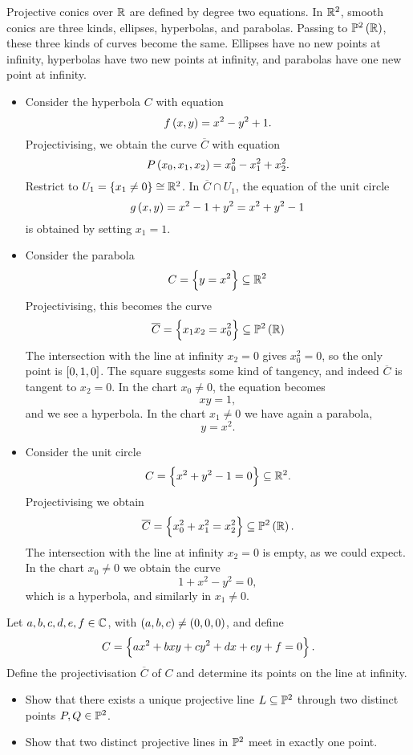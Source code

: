 \begin{example}
Projective conics over $ \R $ are defined by degree two equations. In $ \R^2 $, smooth conics are three kinds, ellipses, hyperbolas, and parabolas. Passing to $ \P^2\br{\R} $, these three kinds of curves become the same. Ellipses have no new points at infinity, hyperbolas have two new points at infinity, and parabolas have one new point at infinity.
\begin{itemize}
\item Consider the hyperbola $ C $ with equation
$$ f\br{x, y} = x^2 - y^2 + 1. $$
Projectivising, we obtain the curve $ \overline{C} $ with equation
$$ P\br{x_0, x_1, x_2} = x_0^2 - x_1^2 + x_2^2. $$
Restrict to $ U_1 = \cbr{x_1 \ne 0} \cong \R^2 $. In $ \overline{C} \cap U_1 $, the equation of the unit circle
$$ g\br{x, y} = x^2 - 1 + y^2 = x^2 + y^2 - 1 $$
is obtained by setting $ x_1 = 1 $.
\item Consider the parabola
$$ C = \cbr{y = x^2} \subseteq \R^2 $$
Projectivising, this becomes the curve
$$ \overline{C} = \cbr{x_1x_2 = x_0^2} \subseteq \P^2\br{\R} $$
The intersection with the line at infinity $ x_2 = 0 $ gives $ x_0^2 = 0 $, so the only point is $ \sbr{0, 1, 0} $. The square suggests some kind of tangency, and indeed $ \overline{C} $ is tangent to $ x_2 = 0 $. In the chart $ x_0 \ne 0 $, the equation becomes
$$ xy = 1, $$
and we see a hyperbola. In the chart $ x_1 \ne 0 $ we have again a parabola,
$$ y = x^2. $$
\item Consider the unit circle
$$ C = \cbr{x^2 + y^2 - 1 = 0} \subseteq \R^2. $$
Projectivising we obtain
$$ \overline{C} = \cbr{x_0^2 + x_1^2 = x_2^2} \subseteq \P^2\br{\R}. $$
The intersection with the line at infinity $ x_2 = 0 $ is empty, as we could expect. In the chart $ x_0 \ne 0 $ we obtain the curve
$$ 1 + x^2 - y^2 = 0, $$
which is a hyperbola, and similarly in $ x_1 \ne 0 $.
\end{itemize}
\end{example}

\begin{exercise}
Let $ a, b, c, d, e, f \in \C $, with $ \br{a, b, c} \ne \br{0, 0, 0} $, and define
$$ C = \cbr{ax^2 + bxy + cy^2 + dx + ey + f = 0}. $$
Define the projectivisation $ \overline{C} $ of $ C $ and determine its points on the line at infinity.
\end{exercise}

\begin{exercise}
\label{ex:18}
\hfill
\begin{itemize}
\item Show that there exists a unique projective line $ L \subseteq \P^2 $ through two distinct points $ P, Q \in \P^2 $.
\item Show that two distinct projective lines in $ \P^2 $ meet in exactly one point.
\end{itemize}
\end{exercise}

